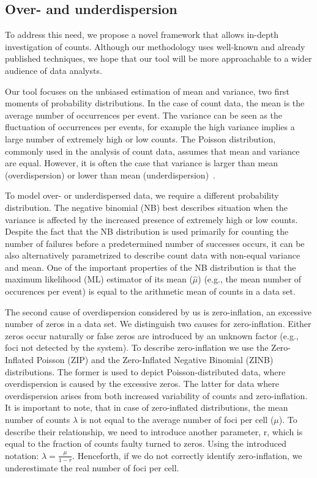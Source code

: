 \subsection{Over- and underdispersion}

To address this need, we propose a novel framework that allows in-depth investigation of counts. Although our methodology uses well-known and already published techniques, we hope that our tool will be more approachable to a wider audience of data analysts.

Our tool focuses on the unbiased estimation of mean and variance, two first moments of probability distributions. In the case of count data, the mean is the average number of occurrences per event. The variance can be seen as the fluctuation of occurrences per events, for example the high variance implies a large number of extremely high or low counts. The Poisson distribution, commonly used in the analysis of count data, assumes that mean and variance are equal. However, it is often the case that variance is larger than mean (overdispersion) or lower than mean (underdispersion)~\citep{Coxremarksoverdispersion1983, morina_generalized_2015_2}.

To model over- or underdispersed data, we require a different probability distribution. The negative binomial (NB) best describes situation when the variance is affected by the increased presence of extremely high or low counts. Despite the fact that the NB distribution is used primarily for counting the number of failures before a predetermined number of successes occurs, it can be also alternatively parametrized to describe count data with non-equal variance and mean. One of the important properties of the NB distribution is that the maximum likelihood (ML) estimator of its mean ($\hat{\mu}$) (e.g., the mean number of occurences per event) is equal to the arithmetic mean of counts in a data set.

The second cause of overdispersion considered by us is zero-inflation, an excessive number of zeros in a data set. We distinguish two causes for zero-inflation. Either zeros occur naturally or false zeros are introduced by an unknown factor (e.g., foci not detected by the system). To describe zero-inflation we use the Zero-Inflated Poisson (ZIP) and the Zero-Inflated Negative Binomial (ZINB) distributions. The former is used to depict Poisson-distributed data, where overdispersion is caused by the excessive zeros. The latter for data where overdispersion arises from both increased variability of counts and zero-inflation. It is important to note, that in case of zero-inflated distributions, the mean number of counts $\lambda$ is not equal to the average number of foci per cell ($\mu$). To describe their relationship, we need to introduce another parameter, r, which is equal to the fraction of counts faulty turned to zeros. Using the introduced notation: $\lambda = \frac{\mu}{1 - r}$. Henceforth, if we do not correctly identify zero-inflation, we underestimate the real number of foci per cell.


